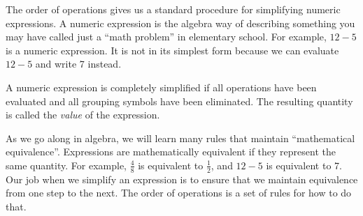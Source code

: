 The order of operations gives us a standard procedure for simplifying numeric expressions. A \gls{numeric expression} is the algebra way of describing something you may have called just a ``math problem'' in elementary school. For example, $12 - 5$ is a numeric expression. It is not in its simplest form because we can evaluate $12 - 5$ and write 7 instead.  

\begin{boxcrit}
A numeric expression is completely simplified if all operations have been evaluated and all grouping symbols have been eliminated. The resulting quantity is called the \textit{value} of the expression.
\end{boxcrit}

As we go along in algebra, we will learn many rules that maintain ``mathematical equivalence''.  Expressions are mathematically equivalent if they represent the same quantity.  For example, $\frac{4}{8}$ is equivalent to $\frac{1}{2}$, and $12 - 5$ is equivalent to 7. Our job when we simplify an expression is to ensure that we maintain equivalence from one step to the next. The order of operations is a set of rules for how to do that.

